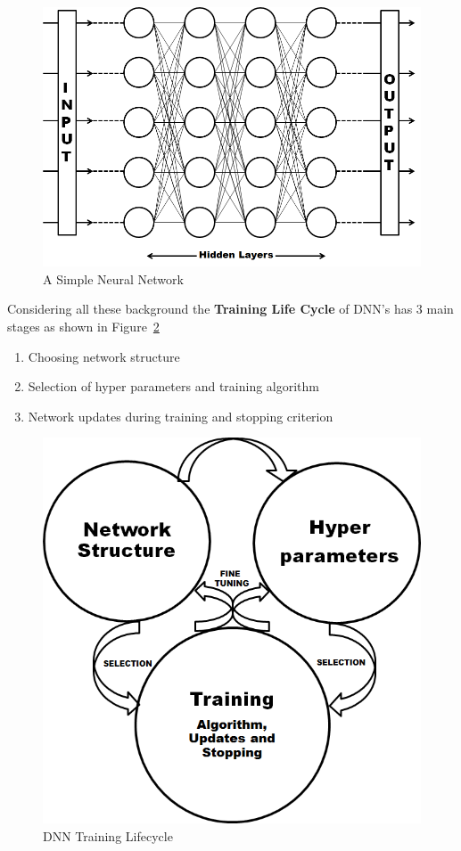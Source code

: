 \begin{figure}
	\centering
	\includegraphics[scale=0.60]{Images/nn_simple_dep}
	\caption{\label{fig:nn_simple_dep} A Simple Neural Network} 
\end{figure}


Considering all these background the \textbf{Training Life Cycle} of DNN's has 3 main stages as shown in Figure~\ref{fig:dnn_lifecycle}

\begin{enumerate}
	\item Choosing network structure
	\item Selection of hyper parameters and training algorithm
	\item Network updates during training and stopping criterion
\end{enumerate}

\begin{figure}
	\centering
	\includegraphics[scale=0.60]{Images/dnn_training_lifecycle}
	\caption{\label{fig:dnn_lifecycle} DNN Training Lifecycle} 
\end{figure}
